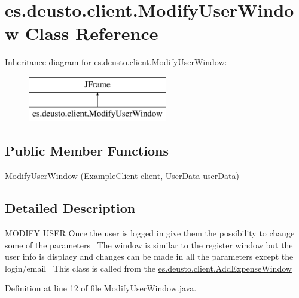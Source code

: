 \hypertarget{classes_1_1deusto_1_1client_1_1_modify_user_window}{}\section{es.\+deusto.\+client.\+Modify\+User\+Window Class Reference}
\label{classes_1_1deusto_1_1client_1_1_modify_user_window}
Inheritance diagram for es.\+deusto.\+client.\+Modify\+User\+Window\+:\begin{figure}[H]
\begin{center}
\leavevmode
\includegraphics[height=2.000000cm]{classes_1_1deusto_1_1client_1_1_modify_user_window}
\end{center}
\end{figure}
\subsection*{Public Member Functions}
\begin{DoxyCompactItemize}
\item 
\hyperlink{classes_1_1deusto_1_1client_1_1_modify_user_window_aa3748a01efbae39f32f99255a13e5d39}{Modify\+User\+Window} (\hyperlink{classes_1_1deusto_1_1client_1_1_example_client}{Example\+Client} client, \hyperlink{classes_1_1deusto_1_1serialization_1_1_user_data}{User\+Data} user\+Data)
\end{DoxyCompactItemize}


\subsection{Detailed Description}
M\+O\+D\+I\+FY U\+S\+ER Once the user is logged in give them the possibility to change some of the parameters~\newline
The window is similar to the register window but the user info is displaey and changes can be made in all the parameters except the login/email~\newline
This class is called from the \hyperlink{classes_1_1deusto_1_1client_1_1_add_expense_window}{es.\+deusto.\+client.\+Add\+Expense\+Window} 

Definition at line 12 of file Modify\+User\+Window.\+java.



